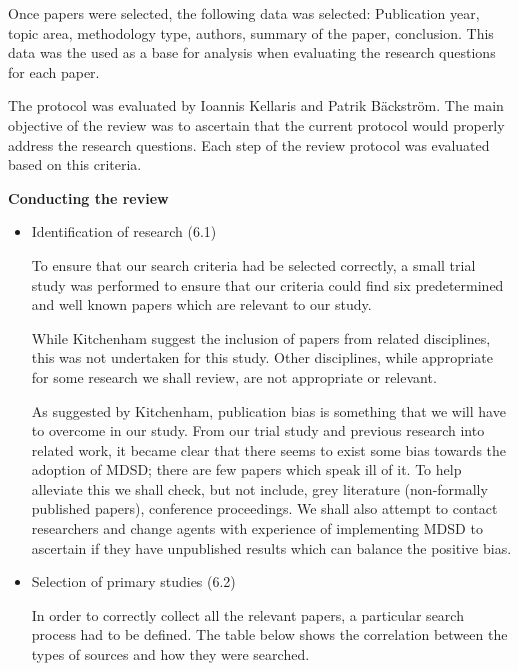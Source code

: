 \documentclass[10pt,twocolumn]{article}
\begin{document}
Once papers were selected, the following data was selected: Publication year, topic area, methodology type, authors, summary of the paper, conclusion. This data was the used as a base for analysis when evaluating the research questions for each paper. 

The protocol was evaluated by Ioannis Kellaris and Patrik B\"ackstr\"om. The main objective of the review was to ascertain that the current protocol would properly address the research questions. Each step of the review protocol was evaluated based on this criteria. 

\textbf{Conducting the review}
\begin{itemize}
\item Identification of research (6.1)

To ensure that our search criteria had be selected correctly, a small trial study was performed to ensure that our criteria could find six predetermined and well known papers which are relevant to our study. %

While Kitchenham\cite{keele2007guidelines} suggest the inclusion of papers from related disciplines, this was not undertaken for this study. Other disciplines, while appropriate for some research we shall review, are not appropriate or relevant. 

As suggested by Kitchenham\cite{keele2007guidelines}, publication bias is something that we will have to overcome in our study. From our trial study and previous research into related work, it became clear that there seems to exist some bias towards the adoption of MDSD; there are few papers which speak ill of it. To help alleviate this we shall check, but not include, grey literature (non-formally published papers), conference proceedings. We shall also attempt to contact researchers and change agents with experience of implementing MDSD to ascertain if they have unpublished results which can balance the positive bias. 

\item Selection of primary studies (6.2)

In order to correctly collect all the relevant papers, a particular search process had to be defined. The table below shows the correlation between the types of sources and how they were searched.


\end{itemize}
\end{document}
